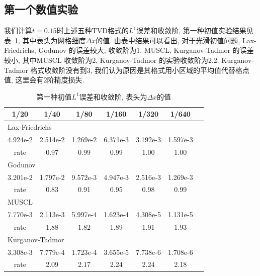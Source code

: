\documentclass[a4paper, 12pt]{amsart}
\numberwithin{equation}{section}
\begin{document}
\subsection{第一个数值实验}\hspace*{\fill}\par
我们计算$t=0.15$时上述五种TVD格式的$L^1$误差和收敛阶, 第一种初值实验结果见表~\ref{tab:task1}, 其中表头为网格细度$\Delta x$的值. 由表中结果可以看出, 对于光滑初值问题, Lax-Friedrichs, Godunov 的误差较大, 收敛阶为1. MUSCL, Kurganov-Tadmor 的误差较小, 其中MUSCL 收敛阶为2, Kurganov-Tadmor 的实验收敛阶为2.2. Kurganov-Tadmor 格式收敛阶没有到3, 我们认为原因是其格式用小区域的平均值代替格点值, 这里会有2阶精度损失.
\begin{table}[htbp]\centering\caption{第一种初值$L^1$误差和收敛阶, 表头为$\Delta x$的值}\label{tab:task1}
\begin{tabular}{ccccccc}
\hline\hline
1/20 & 1/40 & 1/80 & 1/160 & 1/320 & 1/640\\
\hline\hline
\multicolumn{6}{l}{Lax-Friedrichs}\\
4.924e-2 & 2.514e-2 & 1.269e-2 & 6.371e-3 & 3.192e-3 & 1.597e-3\\
rate & 0.97 & 0.99 & 0.99 & 1.00 & 1.00\\ 
\hline
\multicolumn{6}{l}{Godunov}\\
3.201e-2 & 1.797e-2 & 9.572e-3 & 4.947e-3 & 2.516e-3 & 1.269e-3\\
rate & 0.83 & 0.91 & 0.95 & 0.98 & 0.99\\
\hline
\multicolumn{6}{l}{MUSCL}\\
7.770e-3 & 2.113e-3 & 5.997e-4 & 1.623e-4 & 4.308e-5 & 1.131e-5\\
rate & 1.88 & 1.82 & 1.89 & 1.91 & 1.93\\
\hline
\multicolumn{6}{l}{Kurganov-Tadmor}\\
3.308e-3 & 7.779e-4 & 1.723e-4 & 3.655e-5 & 7.738e-6 & 1.708e-6\\
rate & 2.09 & 2.17 & 2.24 & 2.24 & 2.18\\
\hline\hline
\end{tabular}\end{table}
\end{document}
